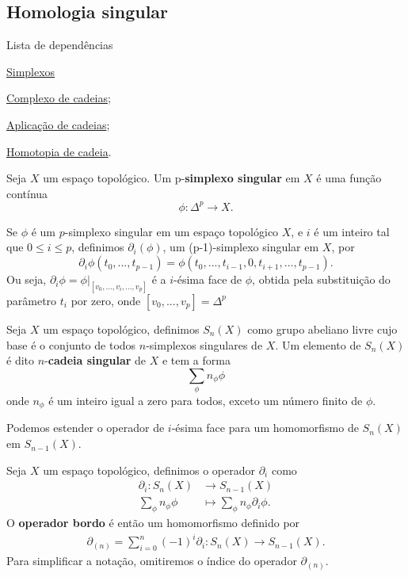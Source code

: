 
\subsection{Homologia singular} %
\label{homologia-singular-def}
\begin{titlemize}{Lista de dependências}
    \item \hyperref[simplexo-def]{Simplexos}
	\item \hyperref[complexo-de-cadeias-def]{Complexo de cadeias};\\ 
    \item \hyperref[aplicacao-de-cadeias-def]{Aplicação de cadeias};\\
    \item \hyperref[homotopia-de-cadeias-def]{Homotopia de cadeia}.\\
\end{titlemize}

\begin{defi}
    Seja $X$ um espaço topológico. Um p-\textbf{simplexo singular} em $X$ é uma função contínua 
    \[\phi:\Delta^p\longrightarrow X.\]
\end{defi}

\begin{defi}
    Se $\phi$ é um $p$-simplexo singular em um espaço topológico $X$, e $i$ é um inteiro tal que $0\le i\le p$, definimos $\partial_i (\phi)$, um (p-1)-simplexo singular em $X$, por 
    \[\partial_i \phi(t_0,...,t_{p-1})=\phi(t_0,...,t_{i-1},0,t_{i+1},...,t_{p-1}).\]
    Ou seja, $\partial_i \phi=\phi|_{[v_0,...,\widehat{v_i},...,v_{p}]}$ é a $i$-ésima face de $\phi$, obtida pela substituição do parâmetro $t_i$ por zero, onde $[v_0,...,v_p]=\Delta^p$
\end{defi}

\begin{defi}
    Seja $X$ um espaço topológico, definimos $S_n(X)$ como grupo abeliano livre cujo base é o conjunto de todos $n$-simplexos singulares de $X$. Um elemento de $S_n(X)$ é dito $n$-\textbf{cadeia singular} de $X$ e tem a forma 
    \[\sum_\phi n_\phi \phi\]
    onde $n_\phi$ é um inteiro igual a zero para todos, exceto um número finito de $\phi$.
\end{defi}

Podemos estender o operador de $i$-ésima face para um homomorfismo de $S_n(X)$ em $S_{n-1} (X)$. 

\begin{defi}
    Seja $X$ um espaço topológico, definimos o operador $\partial_i$ como
    \begin{align*}
        \partial_i: S_n(X)&\longrightarrow S_{n-1}(X)\\
        \sum_\phi n_\phi \phi&\longmapsto \sum_\phi n_\phi \partial_i\phi.
    \end{align*}
    O \textbf{operador bordo} é então um homomorfismo definido por
    \begin{align*}
        \partial_{(n)}=\sum_{i=0}^n (-1)^i \partial_i:S_n(X)\longrightarrow S_{n-1}(X).
    \end{align*}
    Para simplificar a notação, omitiremos o índice do operador $\partial_{(n)}$.
\end{defi}


